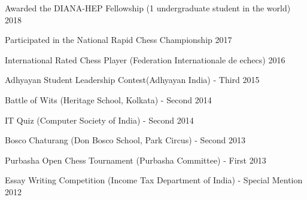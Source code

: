 \documentclass[10pt, letterpaper]{deps1}
\begin{document}
\begin{tightitemize}
	\item Awarded the DIANA-HEP Fellowship (1 undergraduate student in the world) \hfill{2018}
	\item Participated in the National Rapid Chess Championship \hfill{2017}
	\item International Rated Chess Player (Federation Internationale de echecs) \hfill{2016}
	\item Adhyayan Student Leadership Contest(Adhyayan India) - Third \hfill{2015}
	\item Battle of Wits (Heritage School, Kolkata) - Second \hfill{2014}
	\item IT Quiz (Computer Society of India) - Second \hfill{2014}
	\item Bosco Chaturang (Don Bosco School, Park Circus) - Second \hfill{2013}
	\item Purbasha Open Chess Tournament (Purbasha Committee) - First \hfill{2013}
	\item Essay Writing Competition (Income Tax Department of India) - Special Mention \hfill{2012}
\end{tightitemize}
\end{document}
